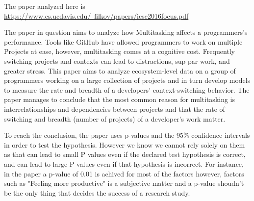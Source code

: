\documentclass[./ProjectReport.tex]{subfiles}
\begin{document}
\maketitle
\begin{center}    
    The paper analyzed here is \href{https://www.cs.ucdavis.edu/~filkov/papers/icse2016focus.pdf}{https://www.cs.ucdavis.edu/~filkov/papers/icse2016focus.pdf}
\end{center}

The paper in question aims to analyze how Multitasking affects a programmers's
performance. Tools like GitHub have allowed programmers to work on multiple Projects
at ease, however, multitasking comes at a cognitive cost. Frequently switching projects 
and contexts can lead to distractions, sup-par work, and greater stress. 
This paper aims to analyze ecosystem-level data on a group of programmers
working on a large collection of projects and in turn develop models to measure
the rate and breadth of a developers’ context-switching behavior.
The paper manages to conclude that the most common reason for
multitasking is interrelationships and dependencies between
projects and that the rate of switching and breadth 
(number of projects) of a developer’s work matter.

To reach the conclusion, the paper uses p-values and the 95\% confidence 
intervals in order to test the hypothesis. However we know we cannot rely 
solely on them as that can lead to small P values even if the declared 
test hypothesis is correct, and can lead to large P values even if that 
hypothesis is incorrect. For instance, in the paper a p-value of 0.01 is achived
for most of the factors however, factors such as "Feeling more productive" is
a subjective matter and a p-value shoudn't be the only thing that decides
the success of a research study.
\end{document}
